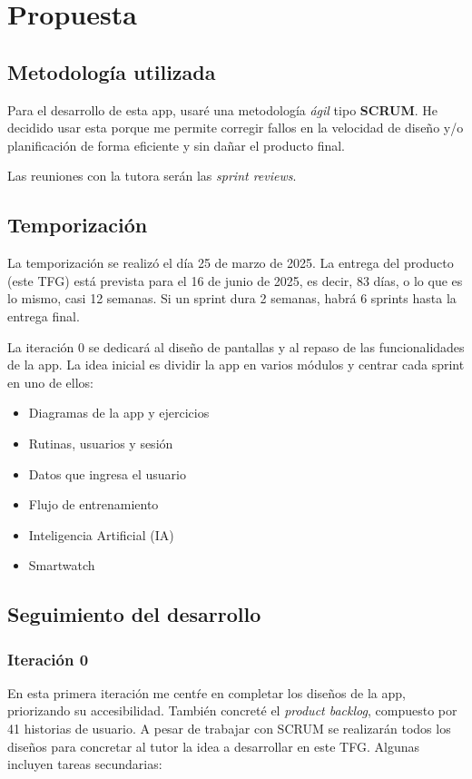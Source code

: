 \chapter{Propuesta}

\section{Metodolog\'ia utilizada}
Para el desarrollo de esta app, usar\'e una metodolog\'ia \textit{\'agil} tipo \textbf{SCRUM}. He decidido usar esta porque me permite corregir fallos en la velocidad de dise\~no y/o planificaci\'on de forma eficiente y sin da\~nar el producto final.

Las reuniones con la tutora ser\'an las \textit{sprint reviews}.

\section{Temporizaci\'on}
La temporizaci\'on se realiz\'o el d\'ia 25 de marzo de 2025. La entrega del producto (este TFG) est\'a prevista para el 16 de junio de 2025, es decir, 83 d\'ias, o lo que es lo mismo, casi 12 semanas. Si un sprint dura 2 semanas, habr\'a 6 sprints hasta la entrega final.

La iteraci\'on 0 se dedicar\'a al dise\~no de pantallas y al repaso de las funcionalidades de la app. La idea inicial es dividir la app en varios m\'odulos y centrar cada sprint en uno de ellos:

\begin{itemize}
  \item Diagramas de la app y ejercicios
  \item Rutinas, usuarios y sesi\'on
  \item Datos que ingresa el usuario
  \item Flujo de entrenamiento
  \item Inteligencia Artificial (IA)
  \item Smartwatch
\end{itemize}

\section{Seguimiento del desarrollo}

\subsection{Iteraci\'on 0}
En esta primera iteraci\'on me cent\'re en completar los dise\~nos de la app, priorizando su accesibilidad. Tambi\'en concret\'e el \textit{product backlog}, compuesto por 41 historias de usuario. A pesar de trabajar con SCRUM se realizarán todos los diseños para concretar al tutor la idea a desarrollar en este TFG.
Algunas incluyen tareas secundarias:

